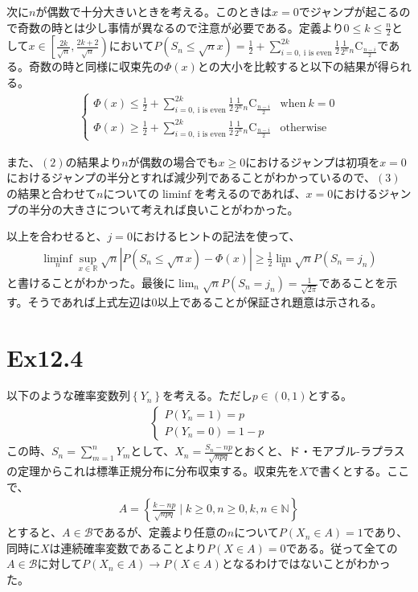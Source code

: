 \documentclass{article}
\begin{document}
次に$n$が偶数で十分大きいときを考える。このときは$x=0$でジャンプが起こるので奇数の時とは少し事情が異なるので注意が必要である。定義より$0\leq k\leq \frac{n}{2}$として$x\in \left[ \frac{2k}{\sqrt{n}}, \frac{2k+2}{\sqrt{n}} \right)$において$P\left( S_n \leq \sqrt{n} x \right) = \frac{1}{2} + \sum_{i=0,\ \text{i is even}}^{2k} \frac{1}{2} \frac{1}{2^n} {}_n \mathrm{C} _\frac{n-i}{2}$である。奇数の時と同様に収束先の$\Phi(x)$との大小を比較すると以下の結果が得られる。
\begin{align}
	\begin{cases}
	\Phi(x) \leq \frac{1}{2} + \sum_{i=0,\ \text{i is even}}^{2k} \frac{1}{2} \frac{1}{2^n} {}_n \mathrm{C} _\frac{n-i}{2} & \text{when}\ k=0\\[8pt]
	\Phi(x) \geq \frac{1}{2} + \sum_{i=0,\ \text{i is even}}^{2k} \frac{1}{2} \frac{1}{2^n} {}_n \mathrm{C} _\frac{n-i}{2} & \text{otherwise}
	\end{cases}
\end{align}

また、$(2)$の結果より$n$が偶数の場合でも$x\geq0$におけるジャンプは初項を$x=0$におけるジャンプの半分とすれば減少列であることがわかっているので、$(3)$の結果と合わせて$n$についての$\liminf$を考えるのであれば、$x=0$におけるジャンプの半分の大きさについて考えれば良いことがわかった。

以上を合わせると、$j=0$におけるヒントの記法を使って、
\begin{align*}
	\liminf_n \sup_{x\in \mathbb{R}} \sqrt{n} \left| P\left( S_n \leq \sqrt{n} x \right) - \Phi(x) \right| \geq \frac{1}{2} \lim_n \sqrt{n} P\left( S_n = j_n \right)
\end{align*}
と書けることがわかった。最後に$\lim_n \sqrt{n} P\left( S_n = j_n \right) = \frac{1}{\sqrt{2\pi}}$であることを示す。そうであれば上式左辺は$0$以上であることが保証され題意は示される。



\section{Ex12.4}
以下のような確率変数列$\left\{ Y_n \right\}$を考える。ただし$p\in (0,1)$とする。
\begin{align*}
\begin{cases}
	P\left( Y_n = 1 \right) = p\\[8pt]
	P\left( Y_n = 0 \right) = 1-p
\end{cases}
\end{align*}
この時、$S_n = \sum_{m=1}^n Y_m$として、$X_n = \frac{S_n -np}{\sqrt{npq}}$とおくと、ド・モアブル-ラプラスの定理からこれは標準正規分布に分布収束する。収束先を$X$で書くとする。ここで、
\begin{align*}
	A = \left\{ \frac{k-np}{\sqrt{npq}} \mid k \geq 0, n\geq 0, k,n \in \mathbb{N} \right\}
\end{align*}
とすると、$A\in \mathcal{B}$であるが、定義より任意の$n$について$P\left( X_n \in A \right) = 1$であり、同時に$X$は連続確率変数であることより$P\left( X \in A \right) = 0$である。従って全ての$A\in \mathcal{B}$に対して$P\left( X_n \in A \right)\to P\left( X\in A\right)$となるわけではないことがわかった。
\end{document}
